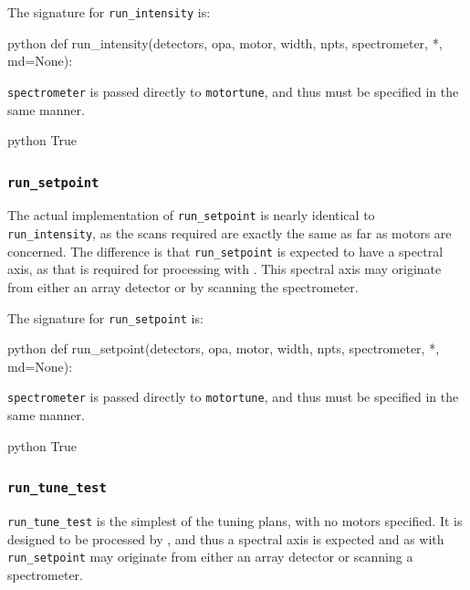 The signature for \texttt{run\_intensity} is:

\begin{codefragment}{python}
def run_intensity(detectors, opa, motor, width, npts, spectrometer, *, md=None):
\end{codefragment}

\texttt{spectrometer} is passed directly to \texttt{motortune}, and thus must be specified in the same manner.

\begin{codefragment}{python}
True
\end{codefragment}

\subsubsection{\texttt{run\_setpoint}}

The actual implementation of \texttt{run\_setpoint} is nearly identical to \texttt{run\_intensity}, as the scans required are exactly the same as far as motors are concerned.
The difference is that \texttt{run\_setpoint} is expected to have a spectral axis, as that is required for processing with .
This spectral axis may originate from either an array detector or by scanning the spectrometer.

The signature for \texttt{run\_setpoint} is:

\begin{codefragment}{python}
def run_setpoint(detectors, opa, motor, width, npts, spectrometer, *, md=None):
\end{codefragment}

\texttt{spectrometer} is passed directly to \texttt{motortune}, and thus must be specified in the same manner.

\begin{codefragment}{python}
True
\end{codefragment}

\subsubsection{\texttt{run\_tune\_test}}

\texttt{run\_tune\_test} is the simplest of the tuning plans, with no motors specified.
It is designed to be processed by , and thus a spectral axis is expected and as with \texttt{run\_setpoint} may originate from either an array detector or scanning a spectrometer.

